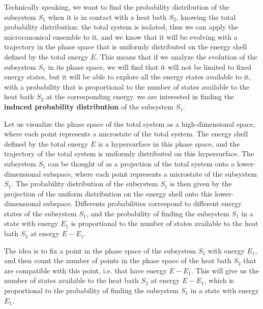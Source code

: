 Technically speaking, we want to find the probability distribution of the subsystem \(S_1\) when it is in contact with a heat bath \(S_2\), knowing the total probability distribution: the total system is isolated, thus we can apply the microcanonical ensemble to it, and we know that it will be evolving with a trajectory in the phase space that is uniformly distributed on the energy shell defined by the total energy \(E\). This means that if we analyze the evolution of the subsystem \(S_1\) in its phase space, we will find that it will not be limited to fixed energy states, but it will be able to explore all the energy states available to it, with a probability that is proportional to the number of states available to the heat bath \(S_2\) at the corresponding energy. we are interested in finding the \textbf{induced probability distribution} of the subsystem \(S_1\).

Let us visualize the phase space of the total system as a high-dimensional space, where each point represents a microstate of the total system. The energy shell defined by the total energy \(E\) is a hypersurface in this phase space, and the trajectory of the total system is uniformly distributed on this hypersurface. The subsystem \(S_1\) can be thought of as a projection of the total system onto a lower-dimensional subspace, where each point represents a microstate of the subsystem \(S_1\). The probability distribution of the subsystem \(S_1\) is then given by the projection of the uniform distribution on the energy shell onto this lower-dimensional subspace. Differents probabilities correspond to different energy states of the subsystem \(S_1\), and the probability of finding the subsystem \(S_1\) in a state with energy \(E_1\) is proportional to the number of states available to the heat bath \(S_2\) at energy \(E - E_1\).

The idea is to fix a point in the phase space of the subsystem \(S_1\) with energy \(E_1\), and then count the number of points in the phase space of the heat bath \(S_2\) that are compatible with this point, i.e. that have energy \(E - E_1\). This will give us the number of states available to the heat bath \(S_2\) at energy \(E - E_1\), which is proportional to the probability of finding the subsystem \(S_1\) in a state with energy \(E_1\).

